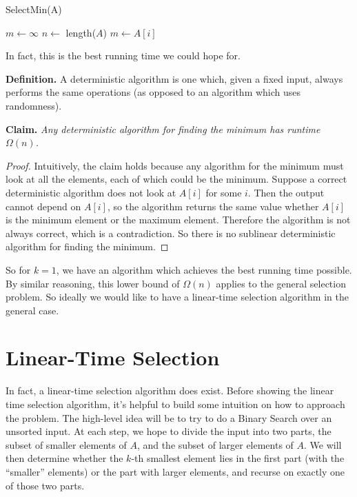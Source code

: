 \documentclass [12pt]{article}
\begin{document}
\begin{algorithm}
\caption{SelectMin(A)}\label{alg:min}
\begin{algorithmic}
\STATE $m \gets \infty$
\STATE $n \gets $ length($A$)
        \STATE $m \gets A[i]$
    \ENDIF
\ENDFOR
\end{algorithmic}
\end{algorithm}

In fact, this is the best running time we could hope for.

\textbf{Definition.} A deterministic algorithm is one which, given a fixed input, always performs the same operations (as opposed to an algorithm which uses randomness).

\textbf{Claim.} \textit{Any deterministic algorithm for finding the minimum has runtime $\Omega(n)$.}

\begin{proof}
Intuitively, the claim holds because any algorithm for the minimum must
look at all the elements, each of which could be the minimum. Suppose a correct deterministic algorithm does not look at $A[i]$ for some $i$. Then the output cannot depend on $A[i]$, so the algorithm returns the same value whether $A[i]$ is the minimum element or the maximum element. Therefore the algorithm is not always correct, which is a contradiction. So there is no sublinear deterministic algorithm for finding the minimum.
\end{proof}

So for $k = 1$, we have an algorithm which achieves the best running time possible. By similar reasoning, this lower bound of $\Omega(n)$ applies to the general selection problem. So ideally we would like to have a linear-time selection algorithm in the general case.

\section{Linear-Time Selection}
In fact, a linear-time selection algorithm does exist. Before showing the linear time selection algorithm, it's helpful to build some intuition on how to approach the problem. The high-level idea will be to try to do a Binary Search over an unsorted input. At each step, we hope to divide the input into two parts, the subset of smaller elements of $A$, and the subset of larger elements of $A$. We will then determine whether the $k$-th smallest element lies in the first part (with the ``smaller'' elements) or the part with larger elements, and recurse on exactly one of
those two parts.
\end{document}
